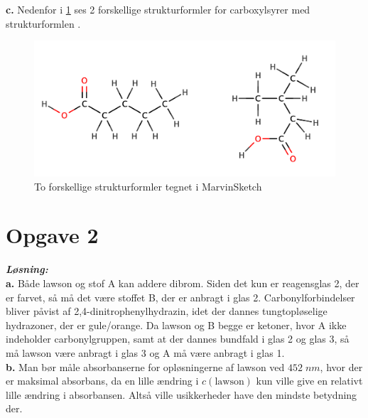 \documentclass{report}
\newcommand{\sol}{\setlength{\parindent}{0cm}\textbf{\textit{Løsning:}}\setlength{\parindent}{1cm}}
\begin{document}
\textbf{c.}
Nedenfor i \cref{fig:carbox} ses 2 forskellige strukturformler for carboxylsyrer med strukturformlen .
\begin{figure}[H]
\begin{center}
  \includegraphics[width=\textwidth]{carbox.png}
\end{center}
\caption{To forskellige strukturformler tegnet i MarvinSketch}
\label{fig:carbox}
\end{figure}

\section*{Opgave 2}
\sol \\
\textbf{a.}
Både lawson og stof A kan addere dibrom. 
Siden det kun er reagensglas 2, der er farvet, så må det være stoffet B, der er anbragt i glas 2.
Carbonylforbindelser bliver påvist af 2,4-dinitrophenylhydrazin, idet der dannes tungtopløselige hydrazoner, der er gule/orange.
Da lawson og B begge er ketoner, hvor A ikke indeholder carbonylgruppen, samt at der dannes bundfald i glas 2 og glas 3, så må lawson være anbragt i glas 3 og A må være anbragt i glas 1. \\[1ex]
\textbf{b.}
Man bør måle absorbanserne for opløsningerne af lawson ved $452 \;\unit{nm} $, hvor der er maksimal absorbans, da en lille ændring i $c(\text{lawson} )$ kun ville give en relativt lille ændring i absorbansen. 
Altså ville usikkerheder have den mindste betydning der.
\end{document}
